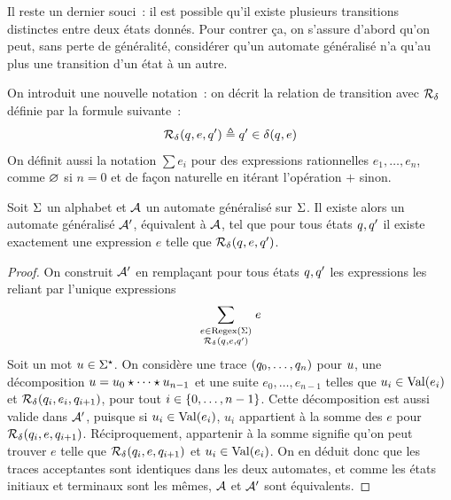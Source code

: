 \begin{figure}[H]
  \centering
\end{figure}

Il reste un dernier souci~: il est possible qu'il existe plusieurs transitions
distinctes entre deux états donnés. Pour contrer ça, on s'assure d'abord qu'on
peut, sans perte de généralité, considérer qu'un automate généralisé n'a qu'au
plus une transition d'un état à un autre.

On introduit une nouvelle notation~: on décrit la relation de transition avec
$\mathrel{\mathcal{R}}_{\delta_{}}$ définie par la formule suivante~:
\[\mathord{\mathrel{\mathcal{R}}_{\delta_{}}}(q_{},e,q_{}') \triangleq q_{}' \in \delta_{}(q_{},e)\]
On définit aussi la notation $\sum e_i$ pour des expressions rationnelles
$e_1,\ldots,e_n$, comme $\varnothing$ si $n = 0$ et de façon naturelle en
itérant l'opération $+$ sinon.

\begin{proposition}
  Soit $\Sigma$ un alphabet et $\mathcal{A}$ un automate généralisé sur $\Sigma$. Il
  existe alors un automate généralisé $\mathcal{A}'$, équivalent à $\mathcal{A}$, tel que
  pour tous états $q_{},q_{}'$ il existe exactement une expression $e$ telle
  que $\mathord{\mathrel{\mathcal{R}}_{\delta_{}}}(q_{},e,q_{}')$.
\end{proposition}

\begin{proof}
  On construit $\mathcal{A}'$ en remplaçant pour tous états $q_{},q_{}'$ les
  expressions les reliant par l'unique expressions
  \[\sum_{\genfrac{}{}{0pt}{1}{e \in \Regex(\ABA)}{\varRR_{\trA}(\varq,e,\varq')}} e\]
  Soit un mot $u\in \Sigma^{\star}$. On considère une trace
  $(q_{0},\ldots,q_{n})$ pour $u$, une décomposition
  $u = u_0\mathbin{\star}\cdots\mathbin{\star} u_{n-1}$ et une suite
  $e_0,\ldots, e_{n-1}$ telles que $u_i \in \operatorname{Val}(e_i)$ et
  $\mathord{\mathrel{\mathcal{R}}_{\delta_{}}}(q_{i},e_i,q_{i+1})$, pour tout
  $i \in \{0,\ldots,n - 1\}$.
  Cette décomposition est aussi valide dans $\mathcal{A}'$, puisque si
  $u_i \in \operatorname{Val}(e_i)$, $u_i$ appartient à la somme des $e$ pour
  $\mathord{\mathrel{\mathcal{R}}_{\delta_{}}}(q_{i},e,q_{i+1})$. Réciproquement, appartenir
  à la somme signifie qu'on peut trouver $e$ telle que
  $\mathord{\mathrel{\mathcal{R}}_{\delta_{}}}(q_{i},e,q_{i+1})$ et
  $u_i \in \operatorname{Val}(e_i)$. On
  en déduit donc que les traces acceptantes sont identiques dans les deux
  automates, et comme les états initiaux et terminaux sont les mêmes, $\mathcal{A}$
  et $\mathcal{A}'$ sont équivalents.
\end{proof}

